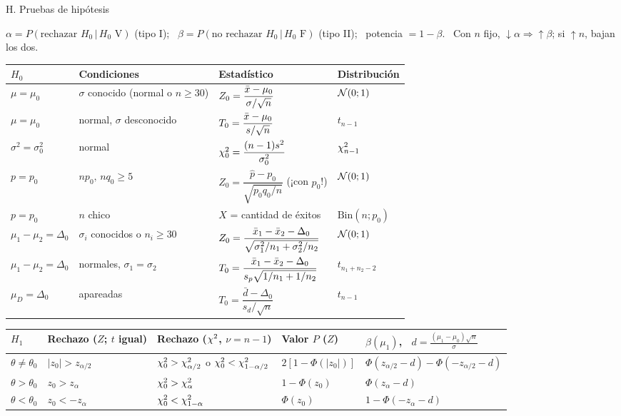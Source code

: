 {\begin{hoja}{H. Pruebas de hipótesis}
\raggedright
$\alpha=P(\text{rechazar }H_0\,|\,H_0\text{ V})$ (tipo I); \ $\beta=P(\text{no rechazar }H_0\,|\,H_0\text{ F})$ (tipo II); \ potencia $=1-\beta$. \ Con $n$ fijo, $\downarrow\alpha\Rightarrow\uparrow\beta$; si $\uparrow n$, bajan los dos.\\[3pt]
\renewcommand{\arraystretch}{1.75}
\begin{tabular}{@{}lll>{\raggedright\arraybackslash}p{2.0cm}@{}}
\toprule
$H_0$ & Condiciones & Estadístico & Distribución\\\midrule
$\mu=\mu_0$ & $\sigma$ conocido (normal o $n\ge30$) & $Z_0=\dfrac{\bar{x}-\mu_0}{\sigma/\sqrt n}$ & $\mathcal{N}(0;1)$\\
$\mu=\mu_0$ & normal, $\sigma$ desconocido & $T_0=\dfrac{\bar{x}-\mu_0}{s/\sqrt n}$ & $t_{n-1}$\\
$\sigma^2=\sigma_0^2$ & normal & $\chi^2_0=\dfrac{(n-1)s^2}{\sigma_0^2}$ & $\chi^2_{n-1}$\\
$p=p_0$ & $np_0,\,nq_0\ge5$ & $Z_0=\dfrac{\hat p-p_0}{\sqrt{p_0q_0/n}}$ (¡con $p_0$!) & $\mathcal{N}(0;1)$\\
$p=p_0$ & $n$ chico & $X$ = cantidad de éxitos & $\mathrm{Bin}(n;p_0)$\\
$\mu_1-\mu_2=\Delta_0$ & $\sigma_i$ conocidos o $n_i\ge30$ & $Z_0=\dfrac{\bar{x}_1-\bar{x}_2-\Delta_0}{\sqrt{\sigma_1^2/n_1+\sigma_2^2/n_2}}$ & $\mathcal{N}(0;1)$\\
$\mu_1-\mu_2=\Delta_0$ & normales, $\sigma_1=\sigma_2$ & $T_0=\dfrac{\bar{x}_1-\bar{x}_2-\Delta_0}{s_p\sqrt{1/n_1+1/n_2}}$ & $t_{n_1+n_2-2}$\\
$\mu_D=\Delta_0$ & apareadas & $T_0=\dfrac{\bar d-\Delta_0}{s_d/\sqrt n}$ & $t_{n-1}$\\
\bottomrule
\end{tabular}

\smallskip
\renewcommand{\arraystretch}{1.35}
\begin{tabular}{@{}lllll@{}}
\toprule
$H_1$ & Rechazo ($Z$; $t$ igual) & Rechazo ($\chi^2$, $\nu=n-1$) & Valor $P$ ($Z$) & $\beta(\mu_1)$, \ $d=\frac{(\mu_1-\mu_0)\sqrt n}{\sigma}$\\\midrule
$\theta\neq\theta_0$ & $|z_0|>z_{\alpha/2}$ & $\chi^2_0>\chi^2_{\alpha/2}$ o $\chi^2_0<\chi^2_{1-\alpha/2}$ & $2[1-\Phi(|z_0|)]$ & $\Phi(z_{\alpha/2}-d)-\Phi(-z_{\alpha/2}-d)$\\
$\theta>\theta_0$ & $z_0>z_\alpha$ & $\chi^2_0>\chi^2_\alpha$ & $1-\Phi(z_0)$ & $\Phi(z_\alpha-d)$\\
$\theta<\theta_0$ & $z_0<-z_\alpha$ & $\chi^2_0<\chi^2_{1-\alpha}$ & $\Phi(z_0)$ & $1-\Phi(-z_\alpha-d)$\\
\bottomrule
\end{tabular}


\end{hoja}}
